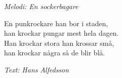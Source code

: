 {\footnotesize\textit{Melodi: En sockerbagare}}\par
\vspace{10pt}
En punkrockare han bor i staden,\\
han krockar pungar mest hela dagen.\\
Han krockar stora han krossar små,\\
han krockar några så de blir blå.
\par
\vspace{10pt}
{\footnotesize\textit{Text: Hans Alfedsson}}
